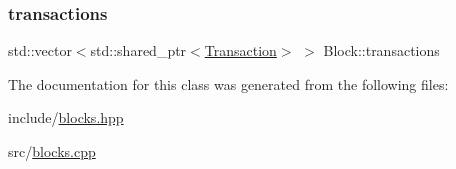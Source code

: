\subsubsection{\texorpdfstring{transactions}{transactions}}
{\footnotesize\ttfamily std\+::vector$<$std\+::shared\+\_\+ptr$<$\mbox{\hyperlink{classTransaction}{Transaction}}$>$ $>$ Block\+::transactions\hspace{0.3cm}{\ttfamily [private]}}



The documentation for this class was generated from the following files\+:\begin{DoxyCompactItemize}
\item 
include/\mbox{\hyperlink{blocks_8hpp}{blocks.\+hpp}}\item 
src/\mbox{\hyperlink{blocks_8cpp}{blocks.\+cpp}}\end{DoxyCompactItemize}
